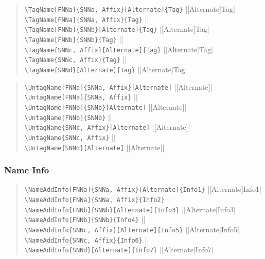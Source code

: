\documentclass[oneside]{article}
\begin{document}
\begin{quote}
\Verb+\TagName[FNNa]{SNNa, Affix}[Alternate]{Tag}+\dotfill
  |[Alternate]{Tag}|\\
\Verb+\TagName[FNNa]{SNNa, Affix}{Tag}+\dotfill
  ||\\
\Verb+\TagName[FNNb]{SNNb}[Alternate]{Tag}+\dotfill
  |[Alternate]{Tag}|\\
\Verb+\TagName[FNNb]{SNNb}{Tag}+\dotfill
  ||\\
\Verb+\TagName{SNNc, Affix}[Alternate]{Tag}+\dotfill
  |[Alternate]{Tag}|\\
\Verb+\TagName{SNNc, Affix}{Tag}+\dotfill
  ||\\
\Verb+\TagName{SNNd}[Alternate]{Tag}+\dotfill
  |[Alternate]{Tag}|
\end{quote}

\begin{quote}
\Verb+\UntagName[FNNa]{SNNa, Affix}[Alternate]+\dotfill
  |[Alternate]|\\
\Verb+\UntagName[FNNa]{SNNa, Affix}+\dotfill
  ||\\
\Verb+\UntagName[FNNb]{SNNb}[Alternate]+\dotfill
  |[Alternate]|\\
\Verb+\UntagName[FNNb]{SNNb}+\dotfill
  ||\\
\Verb+\UntagName{SNNc, Affix}[Alternate]+\dotfill
  |[Alternate]|\\
\Verb+\UntagName{SNNc, Affix}+\dotfill
  ||\\
\Verb+\UntagName{SNNd}[Alternate]+\dotfill
  |[Alternate]|
\end{quote}

\subsubsection{Name Info}

\begin{quote}
\Verb+\NameAddInfo[FNNa]{SNNa, Affix}[Alternate]{Info1}+\dotfill
  |[Alternate]{Info1}|\\
\Verb+\NameAddInfo[FNNa]{SNNa, Affix}{Info2}+\dotfill
  ||\\
\Verb+\NameAddInfo[FNNb]{SNNb}[Alternate]{Info3}+\dotfill
  |[Alternate]{Info3}|\\
\Verb+\NameAddInfo[FNNb]{SNNb}{Info4}+\dotfill
  ||\\
\Verb+\NameAddInfo{SNNc, Affix}[Alternate]{Info5}+\dotfill
  |[Alternate]{Info5}|\\
\Verb+\NameAddInfo{SNNc, Affix}{Info6}+\dotfill
  ||\\
\Verb+\NameAddInfo{SNNd}[Alternate]{Info7}+\dotfill
  |[Alternate]{Info7}|
\end{quote}
\end{document}
